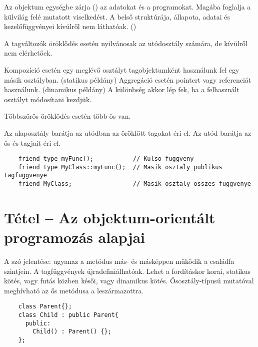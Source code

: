 \documentclass[main.tex]{subfiles}
\begin{document}
  Az objektum egységbe zárja ()
  az adatokat és a programokat. Magába foglalja a
  külvilág felé mutatott viselkedést.  A belső struktúrája,
  állapota, adatai és kezelőfüggvényei kívülről nem láthatóak.
  ()


  A  tagváltozók öröklődés esetén
  nyilvánosak az utódosztály számára,
  de kívülről nem elérhetőek.


  Kompozíció esetén egy meglévő osztályt
  tagobjektumként használunk
  fel egy másik osztályban. (statikus példány)
  Aggregáció esetén pointert vagy referenciát
  használunk. (dinamikus példány)
  A különbség akkor lép fek, ha a felhasznált
  osztályt módosítani kezdjük.


  Többszörös öröklődés esetén több ős van.


  Az alaposztály barátja az utódban az öröklött tagokat éri el.
  Az utód barátja az ős  és  tagjait éri el.
  \begin{lstlisting}
    friend type myFunc();           // Kulso fuggveny
    friend type MyClass::myFunc();  // Masik osztaly publikus tagfuggvenye
    friend MyClass;                 // Masik osztaly osszes fuggvenye
  \end{lstlisting}



  \section{Tétel – Az objektum-orientált programozás alapjai} %

  A szó jelentése: ugyanaz a metódus más-
  és másképpen működik a családfa szintjein.
  A tagfüggvények újradefiniálhatóak.
  Lehet a fordításkor korai, statikus kötés,
  vagy futás közben késői, vagy dinamikus kötés.
  Ősosztály-típusú mutatóval meghívható az ős metódusa a leszármazottra.
  \begin{lstlisting}
    class Parent{};
    class Child : public Parent{
      public:
        Child() : Parent() {};
    };
  \end{lstlisting}
\end{document}
